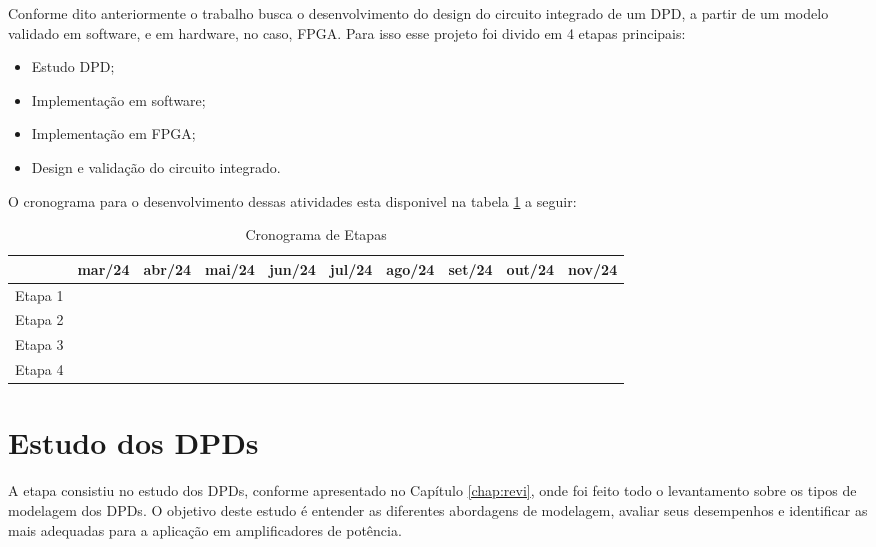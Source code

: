 Conforme dito anteriormente o trabalho busca o desenvolvimento do design do circuito integrado de um DPD, a partir de um modelo validado em software, e em hardware, no caso, FPGA. Para isso esse projeto foi divido em 4 etapas principais:

\begin{itemize}
    \item Estudo DPD;
    \item Implementação em software;
    \item Implementação em FPGA;
    \item Design e validação do circuito integrado.
\end{itemize}

O cronograma para o desenvolvimento dessas atividades esta disponivel na tabela \ref{tab:cronograma} a seguir:

\begin{table}[ht!]
    \centering
    \renewcommand{\arraystretch}{0.8} %
    \setlength{\tabcolsep}{4pt} %
    \begin{tabular}{|l|c|c|c|c|c|c|c|c|c|}
    \hline
    & mar/24 & abr/24 & mai/24 & jun/24 & jul/24 & ago/24 & set/24 & out/24 & nov/24\\
    \hline
    Etapa 1 & \cellcolor{yellow} & \cellcolor{yellow} &&&&&&& \\
    \rowcolor{gray!20} %
    Etapa 2 && \cellcolor{yellow} & \cellcolor{yellow} & \cellcolor{yellow} &&&&&\\
    Etapa 3 &&& \cellcolor{yellow} & \cellcolor{yellow} & \cellcolor{yellow} & \cellcolor{yellow} &&&\\ 
    \rowcolor{gray!20} %
    Etapa 4 &&&&&& \cellcolor{yellow}& \cellcolor{yellow} & \cellcolor{yellow} & \cellcolor{yellow}\\ 
    \hline
\end{tabular}
\caption{Cronograma de Etapas}
\label{tab:cronograma}
\end{table}
    

\section{Estudo dos DPDs}
A etapa consistiu no estudo dos DPDs, conforme apresentado no Capítulo \ref{chap:revi}, onde foi feito todo o levantamento sobre os tipos de modelagem dos DPDs. O objetivo deste estudo é entender as diferentes abordagens de modelagem, avaliar seus desempenhos e identificar as mais adequadas para a aplicação em amplificadores de potência.

